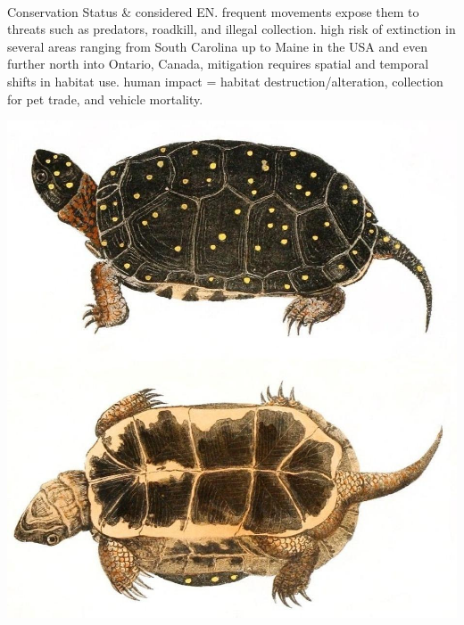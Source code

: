 \begin{center}
\begin{longtabu}
	\\
	\hline
	Conservation Status & 
	considered EN. frequent movements expose them to threats such as predators, roadkill, and illegal collection. high risk of extinction in several areas ranging from South Carolina up to Maine in the USA and even further north into Ontario, Canada, mitigation requires spatial and temporal shifts in habitat use. human impact = habitat destruction/alteration, collection for pet trade, and vehicle mortality.
	\\
	\hline
\end{longtabu}
\includegraphics[scale=0.375]{testudines/emydidae/clemmys/1}
\end{center}